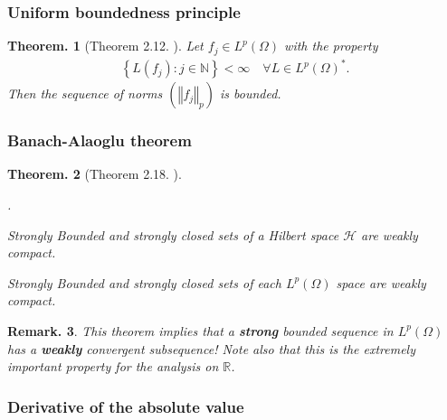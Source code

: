 \documentclass[openany, a4paper, oneside]{book}
\newcounter{enum2}
\renewenvironment{enumerate}{%
\begin{list}%
{%
\arabic{enum2}.\ \,%
}%
{%
\usecounter{enum2}
\setlength{\itemindent}{0pt}%
\setlength{\leftmargin}{6pt}%
\setlength{\rightmargin}{0pt}%
\setlength{\labelsep}{0pt}%
\setlength{\labelwidth}{6pt}%
\setlength{\itemsep}{0pt}%
\setlength{\parsep}{0pt}%
\setlength{\listparindent}{0pt}%
}
}{%
\end{list}%
}
\theoremstyle{break}
\newtheorem{thm}{Theorem.}[section]
\theoremstyle{breakdefn}
\newtheorem{rem}[thm]{Remark.}
\newcommand{\norm}[1]{\left\Vert#1\right\Vert}
\newcommand{\rbk}[1]{\left (#1\right)}
\newcommand{\set}[2]{\left\{#1 : #2\right\}}
\newcommand{\bbN}{\mathbb{N}}
\newcommand{\bbR}{\mathbb{R}}
\newcommand{\calH}{\mathcal{H}}
\newcommand{\upbf}[1]{\textup{\textbf{#1}}}
\begin{document}
\subsubsection{Uniform boundedness principle}
\label{sec-7-10-2-6-3}

\begin{thm}[Theorem 2.12. \cite{LiebLoss1}]\label{Lieb-Loss_Analysis_chap11_2}
 Let $f_j \in L^p (\Omega)$ with the property
 \begin{align}
  \set{L (f_j)}{j \in \bbN} < \infty \quad \forall L \in L^p \rbk{\Omega}^*.
 \end{align}
 Then the sequence of norms $(\norm{f_j}_p)$ is bounded.
\end{thm}
\subsubsection{Banach-Alaoglu theorem}
\label{sec-7-10-2-6-4}

\begin{thm}[Theorem 2.18. \cite{LiebLoss1}]\label{Lieb-Loss_Analysis_chap11_8}
\begin{enumerate}
\item Strongly Bounded and strongly closed sets of a Hilbert space $\calH$ are weakly compact.
\item Strongly Bounded and strongly closed sets of each $L^p \rbk{\Omega}$ space are weakly compact.
\end{enumerate}
\end{thm}
\begin{rem}
 This theorem implies that a \upbf{strong} bounded sequence in $L^p (\Omega)$ has a \upbf{weakly} convergent subsequence!
 Note also that this is the extremely important property for the analysis on $\bbR$.
\end{rem}
\subsubsection{Derivative of the absolute value}
\label{sec-7-10-2-6-5}
\end{document}
